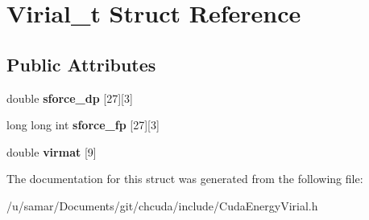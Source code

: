 \hypertarget{structVirial__t}{}\section{Virial\+\_\+t Struct Reference}
\label{structVirial__t}
\subsection*{Public Attributes}
\begin{DoxyCompactItemize}
\item 
\hypertarget{structVirial__t_a05e5da9bdb44f9521b59ad77bfe13b35}{}\label{structVirial__t_a05e5da9bdb44f9521b59ad77bfe13b35} 
double {\bfseries sforce\+\_\+dp} \mbox{[}27\mbox{]}\mbox{[}3\mbox{]}
\item 
\hypertarget{structVirial__t_a03d714e3786a305fd1d695cff594b802}{}\label{structVirial__t_a03d714e3786a305fd1d695cff594b802} 
long long int {\bfseries sforce\+\_\+fp} \mbox{[}27\mbox{]}\mbox{[}3\mbox{]}
\item 
\hypertarget{structVirial__t_a9a17b06589f2174d1892904f470dc95e}{}\label{structVirial__t_a9a17b06589f2174d1892904f470dc95e} 
double {\bfseries virmat} \mbox{[}9\mbox{]}
\end{DoxyCompactItemize}


The documentation for this struct was generated from the following file\+:\begin{DoxyCompactItemize}
\item 
/u/samar/\+Documents/git/chcuda/include/Cuda\+Energy\+Virial.\+h\end{DoxyCompactItemize}
